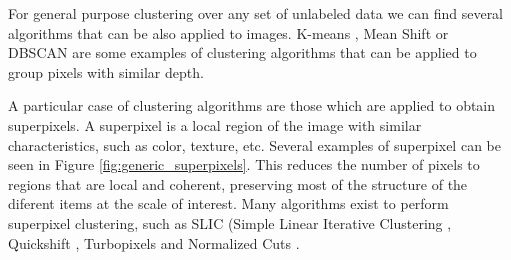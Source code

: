 For general purpose clustering over any set of unlabeled data we can find several algorithms that can be also applied to images. K-means \cite{macqueen1967some}, Mean Shift \cite{comaniciu2002mean} or DBSCAN \cite{ester1996density} are some examples of clustering algorithms that can be applied to group pixels with similar depth.

A particular case of clustering algorithms are those which are applied to obtain superpixels. A superpixel \cite{ren2003learning} is a local region of the image with similar characteristics, such as color, texture, etc. Several examples of superpixel can be seen in Figure \ref{fig:generic_superpixels}. This reduces the number of pixels to regions that are local and coherent, preserving most of the structure of the diferent items at the scale of interest. Many algorithms exist to perform superpixel clustering, such as SLIC (Simple Linear Iterative Clustering \cite{achanta2010slic}, Quickshift \cite{vedaldi2008quick}, Turbopixels \cite{levinshtein2009turbopixels} and Normalized Cuts \cite{mori2005guiding}.

